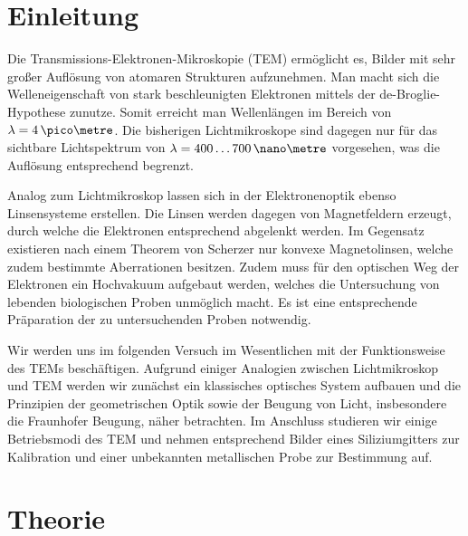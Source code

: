 
\section{Einleitung}
Die Transmissions-Elektronen-Mikroskopie (TEM) ermöglicht es, Bilder mit sehr großer Auflösung von atomaren Strukturen aufzunehmen. Man macht sich die Welleneigenschaft von stark beschleunigten Elektronen mittels der de-Broglie-Hypothese zunutze. Somit erreicht man Wellenlängen im Bereich von $\lambda=4\,\pico\metre$.
Die bisherigen Lichtmikroskope sind dagegen nur für das sichtbare Lichtspektrum von $\lambda=400\dots 700\,\nano\metre$ vorgesehen, was die Auflösung entsprechend begrenzt.

Analog zum Lichtmikroskop lassen sich in der Elektronenoptik ebenso Linsensysteme erstellen. Die Linsen werden dagegen von Magnetfeldern erzeugt, durch welche die Elektronen entsprechend abgelenkt werden. Im Gegensatz existieren nach einem Theorem von Scherzer nur konvexe Magnetolinsen, welche zudem bestimmte Aberrationen besitzen. Zudem muss für den optischen Weg der Elektronen ein Hochvakuum aufgebaut werden, welches die Untersuchung von lebenden biologischen Proben unmöglich macht. Es ist eine entsprechende Präparation der zu untersuchenden Proben notwendig.

Wir werden uns im folgenden Versuch im Wesentlichen mit der Funktionsweise des TEMs beschäftigen. Aufgrund einiger Analogien zwischen Lichtmikroskop und TEM werden wir zunächst ein klassisches optisches System aufbauen und die Prinzipien der geometrischen Optik sowie der Beugung von Licht, insbesondere die Fraunhofer Beugung, näher betrachten.
Im Anschluss studieren wir einige Betriebsmodi des TEM und nehmen entsprechend Bilder eines Siliziumgitters zur Kalibration und einer unbekannten metallischen Probe zur Bestimmung auf.

\newpage
\section{Theorie}
